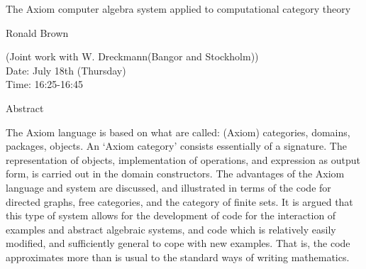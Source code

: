 \begin{center}
\LARGE
The Axiom computer algebra system applied to
                 computational category theory

\end{center}

\begin{center}
\Large
Ronald Brown
\end{center}

\noindent
(Joint work with W. Dreckmann(Bangor and Stockholm)) \\
Date:  July 18th (Thursday)\\
Time:  16:25-16:45\\

\begin{center}
\large
Abstract
\end{center}

The Axiom language is based on what are called: (Axiom) categories, domains, packages, objects.
An `Axiom category' consists essentially of a signature. The representation of objects,
implementation of operations, and expression as output form, is carried out in the domain
constructors. The advantages of the Axiom language and system are discussed, and illustrated in
terms of the code for directed graphs, free categories, and the category of finite sets. It is argued
that this type of system allows for the development of code for the interaction of examples and
abstract algebraic systems, and code which is relatively easily modified, and sufficiently general to
cope with new examples. That is, the code approximates more than is usual to the standard ways of
writing mathematics. 

